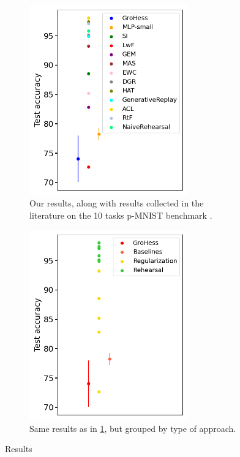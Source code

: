 \documentclass[11pt]{article}
\begin{document}
\begin{figure}
    \centering
    \begin{subfigure}[b]{0.4\textwidth}
        \centering
        \includegraphics[width=0.75\textwidth]{images/lit.png}
        \caption{Our results, along with results collected in the literature on the 10 tasks p-MNIST benchmark \cite{SI}\cite{LwF}\cite{replay_6_GEM}\cite{MAS}\cite{EWC_0}\cite{replay_7_DGR}\cite{HAT}\cite{EWC_6_Adversarial_CL}\cite{replay_5_RtF}.}
        \label{fig:results}
    \end{subfigure}
    \hspace{-0mm}
    \begin{subfigure}[b]{0.4\textwidth}
        \centering
        \includegraphics[width=0.75\textwidth]{images/lit_grouped.png}
        \caption{Same results as in \ref{fig:results}, but grouped by type of approach.}
        \label{fig:results_grouped}
    \end{subfigure}
    \caption{Results}
\end{figure}
\end{document}
